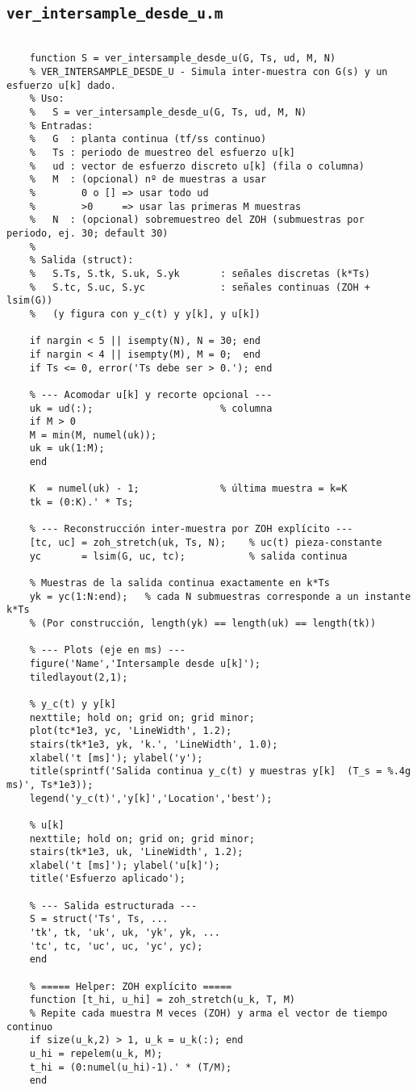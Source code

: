 \subsection{\texttt{ver\_intersample\_desde\_u.m}}
\begin{lstlisting}[style=matlabstyle,caption={Reconstrucción inter-muestra desde u[k].}]

	function S = ver_intersample_desde_u(G, Ts, ud, M, N)
	% VER_INTERSAMPLE_DESDE_U - Simula inter-muestra con G(s) y un esfuerzo u[k] dado.
	% Uso:
	%   S = ver_intersample_desde_u(G, Ts, ud, M, N)
	% Entradas:
	%   G  : planta continua (tf/ss continuo)
	%   Ts : periodo de muestreo del esfuerzo u[k]
	%   ud : vector de esfuerzo discreto u[k] (fila o columna)
	%   M  : (opcional) nº de muestras a usar
	%        0 o [] => usar todo ud
	%        >0     => usar las primeras M muestras
	%   N  : (opcional) sobremuestreo del ZOH (submuestras por periodo, ej. 30; default 30)
	%
	% Salida (struct):
	%   S.Ts, S.tk, S.uk, S.yk       : señales discretas (k*Ts)
	%   S.tc, S.uc, S.yc             : señales continuas (ZOH + lsim(G))
	%   (y figura con y_c(t) y y[k], y u[k])
	
	if nargin < 5 || isempty(N), N = 30; end
	if nargin < 4 || isempty(M), M = 0;  end
	if Ts <= 0, error('Ts debe ser > 0.'); end
	
	% --- Acomodar u[k] y recorte opcional ---
	uk = ud(:);                      % columna
	if M > 0
	M = min(M, numel(uk));
	uk = uk(1:M);
	end
	
	K  = numel(uk) - 1;              % última muestra = k=K
	tk = (0:K).' * Ts;
	
	% --- Reconstrucción inter-muestra por ZOH explícito ---
	[tc, uc] = zoh_stretch(uk, Ts, N);    % uc(t) pieza-constante
	yc       = lsim(G, uc, tc);           % salida continua
	
	% Muestras de la salida continua exactamente en k*Ts
	yk = yc(1:N:end);   % cada N submuestras corresponde a un instante k*Ts
	% (Por construcción, length(yk) == length(uk) == length(tk))
	
	% --- Plots (eje en ms) ---
	figure('Name','Intersample desde u[k]');
	tiledlayout(2,1);
	
	% y_c(t) y y[k]
	nexttile; hold on; grid on; grid minor;
	plot(tc*1e3, yc, 'LineWidth', 1.2);
	stairs(tk*1e3, yk, 'k.', 'LineWidth', 1.0);
	xlabel('t [ms]'); ylabel('y');
	title(sprintf('Salida continua y_c(t) y muestras y[k]  (T_s = %.4g ms)', Ts*1e3));
	legend('y_c(t)','y[k]','Location','best');
	
	% u[k]
	nexttile; hold on; grid on; grid minor;
	stairs(tk*1e3, uk, 'LineWidth', 1.2);
	xlabel('t [ms]'); ylabel('u[k]');
	title('Esfuerzo aplicado');
	
	% --- Salida estructurada ---
	S = struct('Ts', Ts, ...
	'tk', tk, 'uk', uk, 'yk', yk, ...
	'tc', tc, 'uc', uc, 'yc', yc);
	end
	
	% ===== Helper: ZOH explícito =====
	function [t_hi, u_hi] = zoh_stretch(u_k, T, M)
	% Repite cada muestra M veces (ZOH) y arma el vector de tiempo continuo
	if size(u_k,2) > 1, u_k = u_k(:); end
	u_hi = repelem(u_k, M);
	t_hi = (0:numel(u_hi)-1).' * (T/M);
	end
\end{lstlisting}
